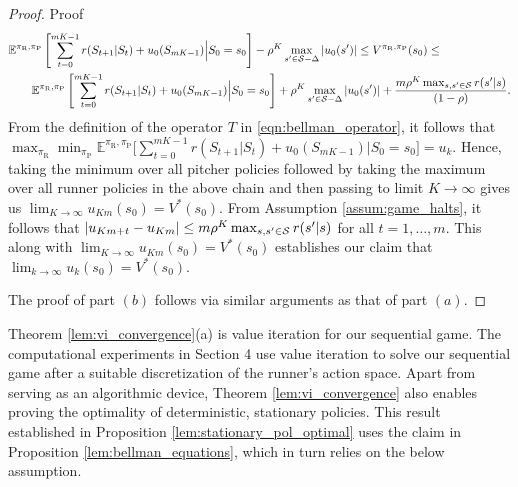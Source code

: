 \documentclass[opre,dblanonrev]{informs4}
\newcommand{\abs}[1]{\left\lvert#1\right\rvert}
\begin{document}
\begin{APPENDICES}
\begin{proof}{Proof}
           \begin{align*}
           &\mathbb{E}^{\pi_\text{R},\pi_\text{P}}\left[\sum_{t=0}^{mK-1} r(S_{t+1}|S_t) + u_0(S_{mK-1}) \Big| S_0 = s_0\right] -\rho^K \max_{s' \in {\cal S}-\Delta}\abs{u_0(s')} \leq  V^{\pi_\text{R},\pi_\text{P}}(s_0) \leq\\
           &\qquad \mathbb{E}^{\pi_\text{R},\pi_\text{P}}\left[\sum_{t=0}^{mK-1} r(S_{t+1}|S_t) + u_0(S_{mK-1}) \Big| S_0 = s_0\right] +\rho^K \max_{s' \in {\cal S}-\Delta}\abs{u_0(s')} + \frac{m\rho^K\max_{s,s' \in {\cal S}}r(s'|s)}{(1-\rho)}.
           \end{align*}
           From the definition of the operator $T$ in \eqref{eqn:bellman_operator}, it follows that $\max_{\pi_{\text{R}}}\min_{\pi_\text{P}}\mathbb{E}^{\pi_\text{R},\pi_\text{P}}\big[\sum_{t=0}^{mK-1} r(S_{t+1}|S_t) + u_0(S_{mK-1}) \big| S_0 = s_0\big] = u_k$. Hence, taking the minimum over all pitcher policies followed by taking the maximum over all runner policies in the above chain and then passing to limit $K \to \infty$ gives us $\lim_{K \to \infty}u_{Km}(s_0) = V^*(s_0)$. From Assumption \ref{assum:game_halts}, it follows that $\abs{u_{Km+t} - u_{Km}} \leq m \rho^K \max_{s,s' \in {\cal S}}r(s'|s)$ for all $t=1,\ldots,m$. This along with $\lim_{K \to \infty}u_{Km}(s_0) = V^*(s_0)$ establishes our claim that $\lim_{k \to \infty}u_k(s_0) = V^*(s_0)$.
    
           The proof of part $(b)$ follows via similar arguments as that of part $(a)$.\Halmos
       \end{proof}
    
    Theorem \ref{lem:vi_convergence}(a) is value iteration for our sequential game. The computational experiments in Section 4 use value iteration to solve our sequential game after a suitable discretization of the runner's action space. Apart from serving as an algorithmic device, Theorem \ref{lem:vi_convergence} also enables proving the optimality of deterministic, stationary policies. This result established in Proposition \ref{lem:stationary_pol_optimal} uses the claim in Proposition \ref{lem:bellman_equations}, which in turn relies on the below assumption.
    

\end{APPENDICES}
\end{document}
